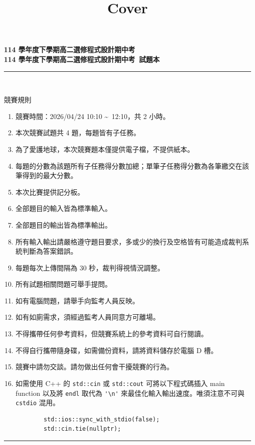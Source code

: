 \documentclass[a4paper]{article}
\title{Cover}
\begin{document}
\begin{center}
\textbf{\huge 114 學年度下學期高二選修程式設計期中考}\\
\vspace{5mm}
\textbf{\huge 114 學年度下學期高二選修程式設計期中考\ 試題本}\\
\vspace{10mm}
\rule{17cm}{2pt}\\
\vspace{5mm}

\huge 競賽規則\\
\end{center}

\fontsize{14pt}{20pt}\selectfont
\begin{enumerate}
    \setlength\itemsep{0.5pt}
    \item 競賽時間：2026/04/24 10:10 \textasciitilde \, 12:10，共 2 小時。
    \item 本次競賽試題共 4 題，每題皆有子任務。
    \item 為了愛護地球，本次競賽題本僅提供電子檔，不提供紙本。
    \item 每題的分數為該題所有子任務得分數加總；單筆子任務得分數為各筆繳交在該筆得到的最大分數。
    \item 本次比賽提供記分板。
    \item 全部題目的輸入皆為標準輸入。
    \item 全部題目的輸出皆為標準輸出。
    \item 所有輸入輸出請嚴格遵守題目要求，多或少的換行及空格皆有可能造成裁判系統判斷為答案錯誤。
    \item 每題每次上傳間隔為 30 秒，裁判得視情況調整。
    \item 所有試題相關問題可舉手提問。
    \item 如有電腦問題，請舉手向監考人員反映。
    \item 如有如廁需求，須經過監考人員同意方可離場。
    \item 不得攜帶任何參考資料，但競賽系統上的參考資料可自行閱讀。
    \item 不得自行攜帶隨身碟，如需備份資料，請將資料儲存於電腦 D 槽。
    \item 競賽中請勿交談。請勿做出任何會干擾競賽的行為。
    \item 如需使用 C++ 的 \lstinline{std::cin} 或 \lstinline{std::cout} 可將以下程式碼插入 main function 以及將 \lstinline{endl} 取代為 \lstinline{'\n'} 來最佳化輸入輸出速度。唯須注意不可與 \lstinline{cstdio} 混用。
        \begin{lstlisting}
        std::ios::sync_with_stdio(false);
        std::cin.tie(nullptr);
        \end{lstlisting}

\end{enumerate}

\begin{center}
\rule{17cm}{2pt}\\
\end{center}
\end{document}
